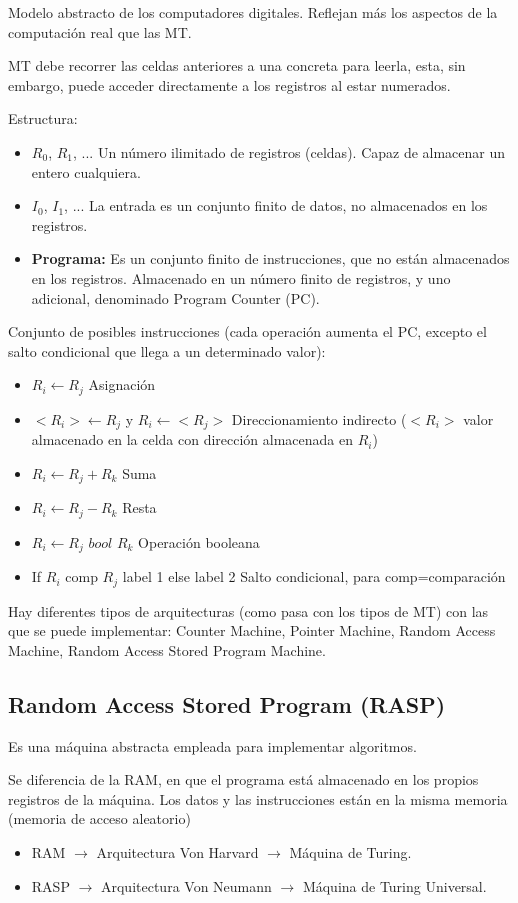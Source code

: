 Modelo abstracto de los computadores digitales. Reflejan más los aspectos de la computación real que las MT.

MT debe recorrer las celdas anteriores a una concreta para leerla, esta, sin embargo, puede acceder directamente a los registros al estar numerados.

Estructura:
\begin{itemize}
	\item $R_0$, $R_1$, ... Un número ilimitado de registros (celdas). Capaz de almacenar un entero cualquiera.
	\item $I_0$, $I_1$, ... La entrada es un conjunto finito de datos, no almacenados en los registros.
	\item \textbf{Programa:} Es un conjunto finito de instrucciones, que no están almacenados en los registros. Almacenado en un número finito de registros, y uno adicional, denominado Program Counter (PC).
\end{itemize}

Conjunto de posibles instrucciones (cada operación aumenta el PC, excepto el salto condicional que llega a un determinado valor):
\begin{itemize}
	\item $R_i \leftarrow R_j$ Asignación
	\item $<R_i> \leftarrow R_j$ y $R_i \leftarrow <R_j>$ Direccionamiento indirecto ($<R_i>$ valor almacenado en la celda con dirección almacenada en $R_i$)
	\item $R_i \leftarrow R_j + R_k$ Suma
	\item $R_i \leftarrow R_j - R_k$ Resta
	\item $R_i \leftarrow R_j \textit{ bool } R_k$ Operación booleana
	\item If $R_i$ comp $R_j$ label 1 else label 2 Salto condicional, para comp=comparación
\end{itemize}

Hay diferentes tipos de arquitecturas (como pasa con los tipos de MT) con las que se puede implementar: Counter Machine, Pointer Machine, Random Access Machine, Random Access Stored Program Machine.

\subsection{Random Access Stored Program (RASP)}
Es una máquina abstracta empleada para implementar algoritmos.

Se diferencia de la RAM, en que el programa está almacenado en los propios registros de la máquina. Los datos y las instrucciones están en la misma memoria (memoria de acceso aleatorio)
\begin{itemize}
	\item RAM $\rightarrow$ Arquitectura Von Harvard $\rightarrow$ Máquina de Turing.
	\item RASP $\rightarrow$ Arquitectura Von Neumann $\rightarrow$ Máquina de Turing Universal.
\end{itemize}

